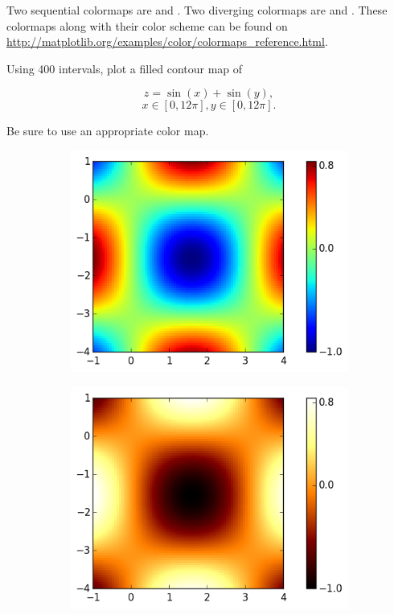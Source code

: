 Two sequential colormaps are  and .  Two diverging colormaps are  and .  These colormaps along with their color scheme can be found on \url{http://matplotlib.org/examples/color/colormaps_reference.html}.




\begin{problem}
Using 400 intervals, plot a filled contour map of

$$z = \sin(x) + \sin(y),$$ $$ x\in[0,12\pi], y\in[0,12\pi].$$ 

Be sure to use an appropriate color map. 
\end{problem}


\begin{figure}
\centering
\begin{subfigure}{.5\textwidth}
  \centering
  \includegraphics[width=\textwidth]{heatmap_color.png}
\end{subfigure}%
\begin{subfigure}{.5\textwidth}
  \centering
  \includegraphics[width=\textwidth]{heatmap_hot.png}

\end{subfigure}
\end{figure}
